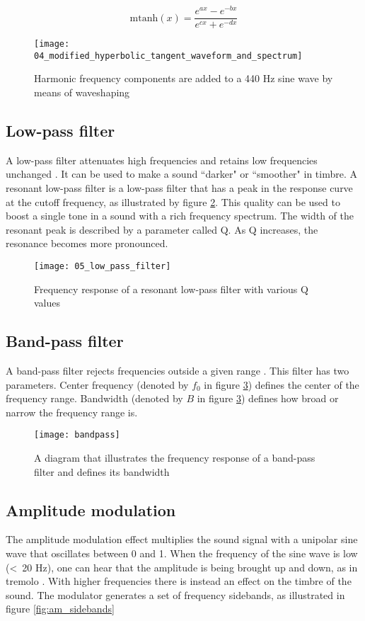 $$\text{mtanh}(x)=\frac{e^{ax}-e^{-bx}}{e^{cx}+e^{-dx}}$$

\begin{figure}[H]
    \centering
    \texttt{[image: 04\_modified\_hyperbolic\_tangent\_waveform\_and\_spectrum]}
    \caption{Harmonic frequency components are added to a 440 Hz sine wave by means of waveshaping}
    \label{fig:modified_hyperbolic_tangent_waveform_and_spectrum}
\end{figure}

\subsection{Low-pass filter}
A low-pass filter attenuates high frequencies and retains low frequencies unchanged \citep{dodge_jerse_1997}. It can be used to make a sound ``darker" or ``smoother" in timbre. A resonant low-pass filter is a low-pass filter that has a peak in the response curve at the cutoff frequency, as illustrated by figure \ref{fig:low_pass_filter}. This quality can be used to boost a single tone in a sound with a rich frequency spectrum. The width of the resonant peak is described by a parameter called Q. As Q increases, the resonance becomes more pronounced.

\begin{figure}[H]
    \centering
    \texttt{[image: 05\_low\_pass\_filter]}
    \caption{Frequency response of a resonant low-pass filter with various Q values}
    \label{fig:low_pass_filter}
\end{figure}

\subsection{Band-pass filter}
A band-pass filter rejects frequencies outside a given range \citep{dodge_jerse_1997}. This filter has two parameters. Center frequency (denoted by $f_0$ in figure \ref{fig:bandpass}) defines the center of the frequency range. Bandwidth (denoted by $B$ in figure \ref{fig:bandpass}) defines how broad or narrow the frequency range is.

\begin{figure}[H]
    \centering
    \texttt{[image: bandpass]}
    \caption{A diagram that illustrates the frequency response of a band-pass filter and defines its bandwidth}
    \label{fig:bandpass}
\end{figure}

\subsection{Amplitude modulation}
The amplitude modulation effect multiplies the sound signal with a unipolar sine wave that oscillates between 0 and 1. When the frequency of the sine wave is low (\textless~20 Hz), one can hear that the amplitude is being brought up and down, as in tremolo \citep{serafin2007}. With higher frequencies there is instead an effect on the timbre of the sound. The modulator generates a set of frequency sidebands, as illustrated in figure \ref{fig:am_sidebands}

